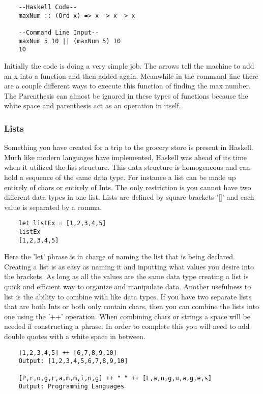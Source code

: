 \documentclass{article}
\begin{document}
    \begin{lstlisting}
    --Haskell Code--
    maxNum :: (Ord x) => x -> x -> x 
    
    --Command Line Input--
    maxNum 5 10 || (maxNum 5) 10
    10
    \end{lstlisting}
    
    Initially the code is doing a very simple job. The arrows tell the machine to add an x into a function and then added again. Meanwhile in the command line there are a couple different ways to execute this function of finding the max number. The Parenthesis can almost be ignored in these types of functions because the white space and parenthesis act as an operation in itself.
    
    \subsubsection{Lists}
    Something you have created for a trip to the grocery store is present in Haskell. Much like modern languages have implemented, Haskell was ahead of its time when it utilized the list structure. This data structure is homogeneous and can hold a sequence of the same data type. For instance a list can be made up entirely of chars or entirely of Ints. The only restriction is you cannot have two different data types in one list. Lists are defined by square brackets '[]' and each value is separated by a comma. 
    
    \begin{lstlisting}
    let listEx = [1,2,3,4,5]
    listEx
    [1,2,3,4,5]
    \end{lstlisting}
    
    Here the 'let' phrase is in charge of naming the list that is being declared. Creating a list is as easy as naming it and inputting what values you desire into the brackets. As long as all the values are the same data type creating a list is quick and efficient way to organize and manipulate data. Another usefulness to list is the ability to combine with like data types. If you have two separate lists that are both Ints or both only contain chars, then you can combine the lists into one using the '++' operation. When combining chars or strings a space will be needed if constructing a phrase. In order to complete this you will need to add double quotes with a white space in between.
    
    \begin{lstlisting}
    [1,2,3,4,5] ++ [6,7,8,9,10]  
    Output: [1,2,3,4,5,6,7,8,9,10]
    
    [P,r,o,g,r,a,m,m,i,n,g] ++ " " ++ [L,a,n,g,u,a,g,e,s]
    Output: Programming Languages
    \end{lstlisting}
    
\end{document}
